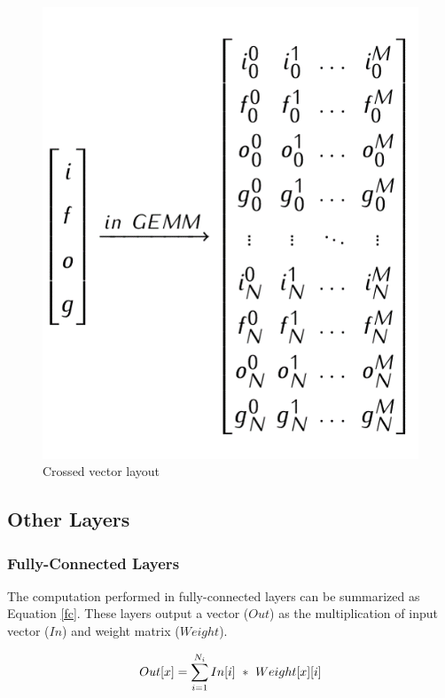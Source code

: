 \documentclass{acm_proc_article-sp-copy}
\begin{document}
\begin{figure}[h]
	\centering
	\includegraphics[width=1.0\linewidth]{figure/z/lstmvec.png}
	\caption{Crossed vector layout}
	\label{lstmvec}
\end{figure}



\subsection{Other Layers}
\subsubsection{Fully-Connected Layers}
The computation performed in fully-connected layers can be summarized as Equation \ref{fc}. These layers output a vector ($Out$) as the multiplication of input vector ($In$) and weight matrix ($Weight$).

\begin{equation}
\centering
Out[x]=\sum_{i=1}^{N_i}In[i]\ *\ Weight[x][i]
\label{fc}
\end{equation}
\end{document}
